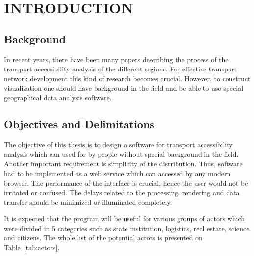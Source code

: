 \section{INTRODUCTION}

\subsection{Background}
In recent years, there have been many papers describing the process of the transport accessibility
analysis  of the different regions. For effective transport network development this kind
of research becomes crucial. However, to construct visualization one should have background
in the field and be able to use special geographical data analysis software.

\subsection{Objectives and Delimitations}
The objective of this thesis is to design a software for transport accessibility analysis
which can used for by people without special background in the field. Another important
requirement is simplicity of the distribution. Thus, software had to be implemented
as a web service which can accessed by any modern browser. The performance of the interface
is crucial, hence the user would not be irritated or confused. The delays related to the processing,
rendering and data transfer should be minimized or illuminated completely.

It is expected that the program will be useful for various groups of actors which
were divided in 5 categories such as state institution, logistics, real estate, science
and citizens. The whole list of the potential actors is presented on Table~\ref{tab:actors}.

